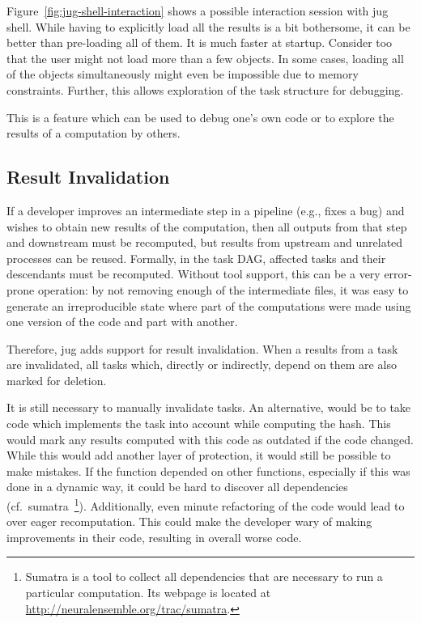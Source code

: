 \documentclass{article}
\begin{document}
Figure~\ref{fig:jug-shell-interaction} shows a possible interaction session
with jug shell. While having to explicitly load all the results is a bit
bothersome, it can be better than pre-loading all of them. It is much faster at
startup. Consider too that the user might not load more than a few objects. In
some cases, loading all of the objects simultaneously might even be impossible
due to memory constraints. Further, this allows exploration of the task
structure for debugging.

This is a feature which can be used to debug one's own code or to explore the
results of a computation by others.

\subsection{Result Invalidation}

If a developer improves an intermediate step in a pipeline (e.g., fixes a bug)
and wishes to obtain new results of the computation, then all outputs from that
step and downstream must be recomputed, but results from upstream and unrelated
processes can be reused. Formally, in the task DAG, affected tasks and their
descendants must be recomputed. Without tool support, this can be a very
error-prone operation: by not removing enough of the intermediate files, it was
easy to generate an irreproducible state where part of the computations were
made using one version of the code and part with another.

Therefore, jug adds support for result invalidation. When a results from a task
are invalidated, all tasks which, directly or indirectly, depend on them are
also marked for deletion.

It is still necessary to manually invalidate tasks. An alternative, would be to
take code which implements the task into account while computing the hash. This
would mark any results computed with this code as outdated if the code changed.
While this would add another layer of protection, it would still be possible to
make mistakes. If the function depended on other functions, especially if this
was done in a dynamic way, it could be hard to discover all dependencies (cf.\
sumatra~\footnote{Sumatra is a tool to collect all dependencies that are
necessary to run a particular computation. Its webpage is located at
\url{http://neuralensemble.org/trac/sumatra}.}). Additionally, even minute
refactoring of the code would lead to over eager recomputation. This could make
the developer wary of making improvements in their code, resulting in overall
worse code.
\end{document}

